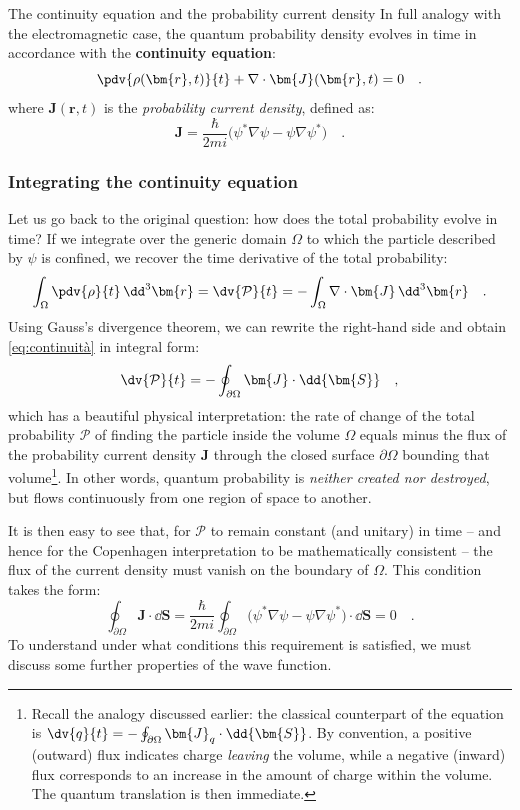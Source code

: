 \begin{concettochiave}{The continuity equation and the probability current density}
    \noindent
    In full analogy with the electromagnetic case, the quantum probability density evolves in time in accordance with the \textbf{continuity equation}:
    \begin{equation}
    \pdv{\rho(\bm{r}, t)}{t} + \nabla \cdot \bm{J}(\bm{r},t) = 0 \quad.
    \label{eq:continuità}
\end{equation}
where $\bm{J}(\bm{r},t)$ is the \emph{probability current density}, defined as:
\begin{equation}
    \bm{J} = \frac{\hbar}{2mi}\big( \psi^*\nabla\psi - \psi\nabla\psi^* \big) \quad.
\end{equation}
\end{concettochiave}

\subsubsection{Integrating the continuity equation}
Let us go back to the original question: how does the total probability evolve in time? If we integrate over the generic domain $\Omega$ to which the particle described by $\psi$ is confined, we recover the time derivative of the total probability:
\[
    \int_\Omega \pdv{\rho}{t} \, \dd^3{\bm{r}} = \dv{\mathcal{P}}{t} = -\int_\Omega \nabla \cdot \bm{J} \, \dd^3{\bm{r}} \quad.
\]
Using Gauss's divergence theorem, we can rewrite the right-hand side and obtain \eqref{eq:continuità} in integral form:
\[
    \dv{\mathcal{P}}{t} = -\oint_{\partial \Omega} \bm{J} \cdot \dd{\bm{S}} \quad,
\]
which has a beautiful physical interpretation: the rate of change of the total probability $\mathcal{P}$ of finding the particle inside the volume $\Omega$ equals minus the flux of the probability current density $\bm{J}$ through the closed surface $\partial \Omega$ bounding that volume\footnote{Recall the analogy discussed earlier: the classical counterpart of the equation is $\dv{q}{t} = -\oint_{\partial \Omega} \bm{J}_q \cdot \dd{\bm{S}}$. By convention, a positive (outward) flux indicates charge \emph{leaving} the volume, while a negative (inward) flux corresponds to an increase in the amount of charge within the volume. The quantum translation is then immediate.}. In other words, quantum probability is \emph{neither created nor destroyed}, but flows continuously from one region of space to another.

It is then easy to see that, for $\mathcal{P}$ to remain constant (and unitary) in time -- and hence for the Copenhagen interpretation to be mathematically consistent -- the flux of the current density must vanish on the boundary of $\Omega$. This condition takes the form:
\[
    \oint_{\partial \Omega} \bm{J} \cdot \dd{\bm{S}} = \frac{\hbar}{2mi} \oint_{\partial \Omega} \big(\psi^*\nabla\psi - \psi\nabla\psi^*\big) \cdot \dd{\bm{S}} = 0 \quad.  
\]
To understand under what conditions this requirement is satisfied, we must discuss some further properties of the wave function.

